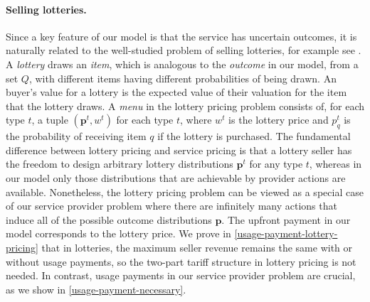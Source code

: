 
\paragraph{Selling lotteries.}

Since a key feature of our model is that the service has uncertain outcomes, it is naturally related to the well-studied problem of selling lotteries, for example see \citet{chen2015complexity}. A \emph{lottery} draws an \emph{item}, which is analogous to the \emph{outcome} in our model, from a set $Q$, with different items having different probabilities of being drawn. An buyer's value for a lottery is the expected value of their valuation for the item that the lottery draws. A \emph{menu} in the lottery pricing problem consists of, for each type $t$, a tuple $(\mathbf{p}^t, w^t)$ for each type $t$, where $w^t$ is the lottery price and $p^t_q$ is the probability of receiving item $q$ if the lottery is purchased. The fundamental difference between lottery pricing and service pricing is that a lottery seller has the freedom to design arbitrary lottery distributions $\mathbf{p}^t$ for any type $t$, whereas in our model only those distributions that are achievable by provider actions are available. Nonetheless, the lottery pricing problem can be viewed as a special case of our service provider problem where there are infinitely many actions that induce all of the possible outcome distributions $\mathbf{p}$. The upfront payment in our model corresponds to the lottery price. We prove in \cref{usage-payment-lottery-pricing} that in lotteries, the maximum seller revenue remains the same with or without usage payments, so the two-part tariff structure in lottery pricing is not needed. In contrast, usage payments in our service provider problem are crucial, as we show in \cref{usage-payment-necessary}.

